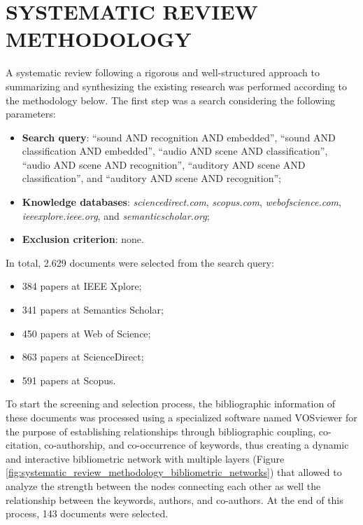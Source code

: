 \chapter{SYSTEMATIC REVIEW METHODOLOGY 
\label{appendix:systematic_review}}

A systematic review following a rigorous and well-structured approach to summarizing and synthesizing the existing research was performed according to the methodology below. The first step was a search considering the following parameters:

\begin{itemize}
   \item \textbf{Search query}:  \enquote{sound AND recognition AND embedded}, \enquote{sound AND classification AND embedded}, \enquote{audio AND scene AND classification}, \enquote{audio AND scene AND recognition}, \enquote{auditory AND scene AND classification}, and \enquote{auditory AND scene AND recognition};
   \item \textbf{Knowledge databases}: \textit{sciencedirect.com}, \textit{scopus.com}, \textit{webofscience.com}, \textit{ieeexplore.ieee.org}, and \textit{semanticscholar.org};
   \item \textbf{Exclusion criterion}: none.
\end{itemize}
In total, 2.629 documents were selected from the search query:
\begin{itemize}
    \item{384 papers at IEEE Xplore};
    \item{341 papers at Semantics Scholar};
    \item{450 papers at Web of Science};
    \item{863 papers at ScienceDirect};
    \item{591 papers at Scopus}.
\end{itemize}

To start the screening and selection process, the bibliographic information of these documents was processed using a specialized software named VOSviewer for the purpose of establishing relationships through bibliographic coupling, co-citation, co-authorship, and co-occurrence of keywords, thus creating a dynamic and interactive bibliometric network with multiple layers (Figure \ref{fig:systematic_review_methodology_bibliometric_networks}) that allowed to analyze the strength between the nodes connecting each other as well the relationship between the keywords, authors, and co-authors. At the end of this process, 143 documents were selected.

